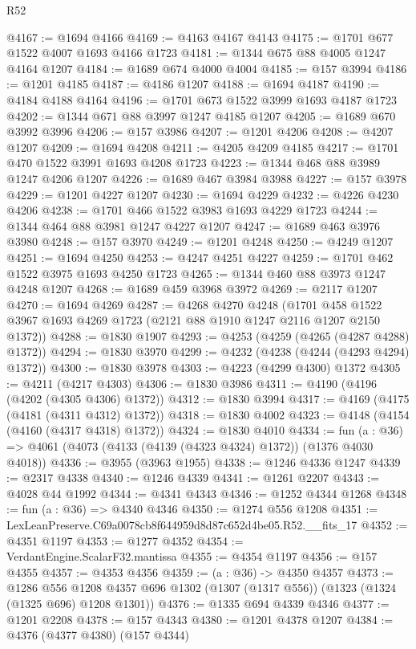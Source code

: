 \begin{lexlean}{R52}
\begin{coremodule}
@4167 := @1694 @4166
@4169 := @4163 @4167 @4143
@4175 := @1701 @677 @1522 @4007 @1693 @4166 @1723
@4181 := @1344 @675 @88 @4005 @1247 @4164 @1207
@4184 := @1689 @674 @4000 @4004
@4185 := @157 @3994
@4186 := @1201 @4185
@4187 := @4186 @1207
@4188 := @1694 @4187
@4190 := @4184 @4188 @4164
@4196 := @1701 @673 @1522 @3999 @1693 @4187 @1723
@4202 := @1344 @671 @88 @3997 @1247 @4185 @1207
@4205 := @1689 @670 @3992 @3996
@4206 := @157 @3986
@4207 := @1201 @4206
@4208 := @4207 @1207
@4209 := @1694 @4208
@4211 := @4205 @4209 @4185
@4217 := @1701 @470 @1522 @3991 @1693 @4208 @1723
@4223 := @1344 @468 @88 @3989 @1247 @4206 @1207
@4226 := @1689 @467 @3984 @3988
@4227 := @157 @3978
@4229 := @1201 @4227 @1207
@4230 := @1694 @4229
@4232 := @4226 @4230 @4206
@4238 := @1701 @466 @1522 @3983 @1693 @4229 @1723
@4244 := @1344 @464 @88 @3981 @1247 @4227 @1207
@4247 := @1689 @463 @3976 @3980
@4248 := @157 @3970
@4249 := @1201 @4248
@4250 := @4249 @1207
@4251 := @1694 @4250
@4253 := @4247 @4251 @4227
@4259 := @1701 @462 @1522 @3975 @1693 @4250 @1723
@4265 := @1344 @460 @88 @3973 @1247 @4248 @1207
@4268 := @1689 @459 @3968 @3972
@4269 := @2117 @1207
@4270 := @1694 @4269
@4287 := @4268
    @4270
    @4248
    (@1701 @458 @1522 @3967 @1693 @4269 @1723 (@2121 @88 @1910 @1247 @2116 @1207 @2150 @1372))
@4288 := @1830 @1907
@4293 := @4253 (@4259 (@4265 (@4287 @4288) @1372))
@4294 := @1830 @3970
@4299 := @4232 (@4238 (@4244 (@4293 @4294) @1372))
@4300 := @1830 @3978
@4303 := @4223 (@4299 @4300) @1372
@4305 := @4211 (@4217 @4303)
@4306 := @1830 @3986
@4311 := @4190 (@4196 (@4202 (@4305 @4306) @1372))
@4312 := @1830 @3994
@4317 := @4169 (@4175 (@4181 (@4311 @4312) @1372))
@4318 := @1830 @4002
@4323 := @4148 (@4154 (@4160 (@4317 @4318) @1372))
@4324 := @1830 @4010
@4334 := fun (a : @36) => @4061 (@4073 (@4133 (@4139 (@4323 @4324) @1372)) (@1376 @4030 @4018))
@4336 := @3955 (@3963 @1955)
@4338 := @1246 @4336 @1247
@4339 := @2317 @4338
@4340 := @1246 @4339
@4341 := @1261 @2207
@4343 := @4028 @44 @1992
@4344 := @4341 @4343
@4346 := @1252 @4344 @1268
@4348 := fun (a : @36) => @4340 @4346
@4350 := @1274 @556 @1208
@4351 := LexLeanPreserve.C69a0078cb8f644959d8d87c652d4be05.R52.__fits_17
@4352 := @4351 @1197
@4353 := @1277 @4352
@4354 := VerdantEngine.ScalarF32.mantissa
@4355 := @4354 @1197
@4356 := @157 @4355
@4357 := @4353 @4356
@4359 := (a : @36) -> @4350 @4357
@4373 := @1286
    @556
    @1208
    @4357
    @696
    @1302
    (@1307 (@1317 @556))
    (@1323 (@1324 (@1325 @696) @1208 @1301))
@4376 := @1335 @694 @4339 @4346
@4377 := @1201 @2208
@4378 := @157 @4343
@4380 := @1201 @4378 @1207
@4384 := @4376 (@4377 @4380) (@157 @4344)

\end{coremodule}
\end{lexlean}
